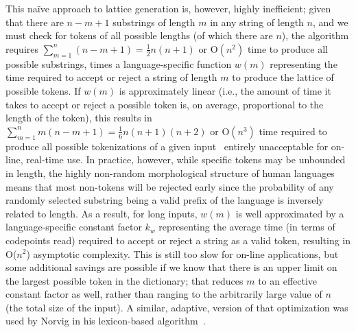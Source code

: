 This naïve approach to lattice generation is, however, highly inefficient; given that there are $n-m+1$ substrings of length $m$ in any string of length $n$, and we must check for tokens of all possible lengths (of which there are $n$), the algorithm requires $\sum_{m=1}^{n}(n-m+1)=\frac{1}{2}n(n+1)$ or O$(n^{2})$ time to produce all possible substrings, times a language-specific function $w(m)$ representing the time required to accept or reject a string of length $m$ to produce the lattice of possible tokens. If $w(m)$ is approximately linear (i.e., the amount of time it takes to accept or reject a possible token is, on average, proportional to the length of the token), this results in $\sum_{m=1}^{n}m(n-m+1)=\frac{1}{6}n(n+1)(n+2)$ or O$(n^{3})$ time required to produce all possible tokenizations of a given input\textemdash~ entirely unacceptable for on-line, real-time use.
In practice, however, while specific tokens may be unbounded in length, the highly non-random morphological structure of human languages means that most non-tokens will be rejected early since the probability of any randomly selected substring being a valid prefix of the language is inversely related to length. As a result, for long inputs, $w(m)$ is well approximated by a language-specific constant factor $k_w$ representing the average time (in terms of codepoints read) required to accept or reject a string as a valid token, resulting in O($n^{2}$) asymptotic complexity. This is still too slow for on-line applications, but some additional savings are possible if we know that there is an upper limit on the largest possible token in the dictionary; that reduces $m$ to an effective constant factor as well, rather than ranging to the arbitrarily large value of $n$ (the total size of the input). A similar, adaptive, version of that optimization was used by Norvig in his lexicon-based algorithm~\cite{norvig14}.

